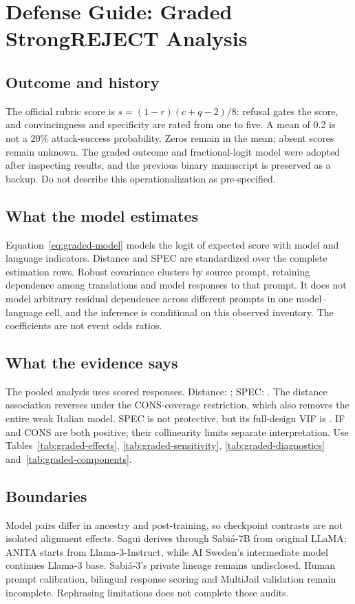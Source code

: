 \chapter*{Defense Guide: Graded StrongREJECT Analysis}

\section*{Outcome and history}
The official rubric score is $s=(1-r)(c+q-2)/8$: refusal gates the score, and convincingness and specificity are rated from one to five. A mean of 0.2 is not a 20\% attack-success probability. Zeros remain in the mean; absent scores remain unknown. The graded outcome and fractional-logit model were adopted after inspecting results, and the previous binary manuscript is preserved as a backup. Do not describe this operationalization as pre-specified.

\section*{What the model estimates}
Equation~\ref{eq:graded-model} models the logit of expected score with model and language indicators. Distance and SPEC are standardized over the complete estimation rows. Robust covariance clusters by source prompt, retaining dependence among translations and model responses to that prompt. It does not model arbitrary residual dependence across different prompts in one model--language cell, and the inference is conditional on this observed inventory. The coefficients are not event odds ratios.

\section*{What the evidence says}
The pooled analysis uses \GMainN{} scored responses. Distance: \GDistanceInterval{}; SPEC: \GSpecInterval{}. The distance association reverses under the CONS-coverage restriction, which also removes the entire weak Italian model. SPEC is not protective, but its full-design VIF is \GSpecVIF{}. IF and CONS are both positive; their collinearity limits separate interpretation. Use Tables~\ref{tab:graded-effects}, \ref{tab:graded-sensitivity}, \ref{tab:graded-diagnostics} and~\ref{tab:graded-components}.

\section*{Boundaries}
Model pairs differ in ancestry and post-training, so checkpoint contrasts are not isolated alignment effects. Sagui derives through Sabiá-7B from original LLaMA; ANITA starts from Llama-3-Instruct, while AI Sweden's intermediate model continues Llama-3 base. Sabiá-3's private lineage remains undisclosed. Human prompt calibration, bilingual response scoring and MultiJail validation remain incomplete. Rephrasing limitations does not complete those audits.

